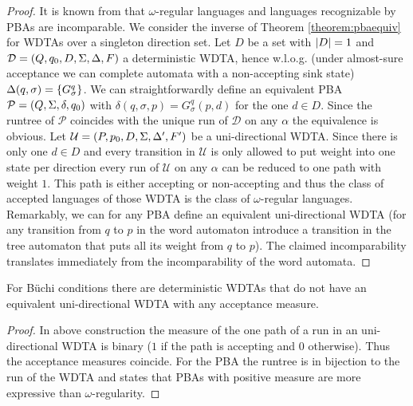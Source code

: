 \begin{proof}
  It is known from \cite[Theorem 4 (b), (c)]{DecProblemsForProbAuto} that
  $\omega$-regular languages and languages recognizable by \acp{PBA} are
  incomparable. We consider the inverse of Theorem \ref{theorem:pbaequiv} for
  \acp{WDTA} over a singleton direction set. Let $D$ be a set with $\left\vert{D}\right\vert=1$
  and $\mathcal{D} = \left(Q, q_{0}, D, \Sigma, \Delta, F\right)$ a deterministic
  \ac{WDTA}, hence w.l.o.g. (under almost-sure acceptance we can complete
  automata with a non-accepting sink state)
  $\Delta(q,\sigma) = \left\{G^{q}_{\sigma}\right\}$. We can straightforwardly define an
  equivalent \ac{PBA} $\mathcal{P} = \left(Q, \Sigma, \delta, q_{0}\right)$ with
  $\delta(q, \sigma, p) = G^{q}_{\sigma}(p, d)$ for the one $d\in D$. Since the
  runtree of $\mathcal{P}$ coincides with the unique run of $\mathcal{D}$ on
  any $\alpha$ the equivalence is obvious. Let
  $\mathcal{U} = \left(P, p_{0}, D, \Sigma, \Delta', F'\right)$ be a uni-directional
  \ac{WDTA}. Since there is only one $d\in D$ and every transition in
  $\mathcal{U}$ is only allowed to put weight into one state per direction
  every run of $\mathcal{U}$ on any $\alpha$ can be reduced to one path with
  weight $1$. This path is either accepting or non-accepting and thus
  the class of accepted languages of those \ac{WDTA} is the class of
  $\omega$-regular languages. Remarkably, we can for any \ac{PBA} define an
  equivalent uni-directional \ac{WDTA} (for any transition from $q$ to $p$ in
  the word automaton introduce a transition in the tree automaton that puts all
  its weight from $q$ to $p$). The claimed incomparability translates
  immediately from the incomparability of the word automata.
\end{proof}
\begin{corollary}
  For Büchi conditions there are deterministic \acp{WDTA} that do not have an
  equivalent uni-directional \ac{WDTA} with any acceptance measure.
\end{corollary}
\begin{proof}
  In above construction the measure of the one path of a run in an
  uni-directional \ac{WDTA} is binary ($1$ if the path is accepting and $0$
  otherwise). Thus the acceptance measures coincide. For the \ac{PBA} the
  runtree is in bijection to the run of the \ac{WDTA} and
  \cite[Theorem 4]{RecOmeLangProbAuto} states that \acp{PBA} with positive
  measure are more expressive than $\omega$-regularity.
\end{proof}
